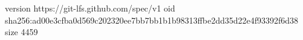 version https://git-lfs.github.com/spec/v1
oid sha256:ad00e3cfba0d569c202320ee7bb7bb1b1b98313ffbe2dd35d22e4f93392f6d38
size 4459
